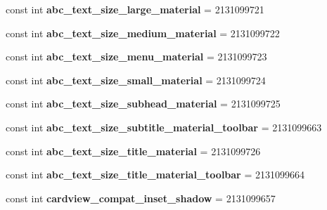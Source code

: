 \begin{DoxyCompactItemize}
const int {\bfseries abc\+\_\+text\+\_\+size\+\_\+large\+\_\+material} = 2131099721
\item 
\mbox{\label{classXaria_1_1Resource_1_1Dimension_a63049d1b1aaddedee1c0da841ba40f75}} 
const int {\bfseries abc\+\_\+text\+\_\+size\+\_\+medium\+\_\+material} = 2131099722
\item 
\mbox{\label{classXaria_1_1Resource_1_1Dimension_aeff3de42f717e6b0f89082926430a041}} 
const int {\bfseries abc\+\_\+text\+\_\+size\+\_\+menu\+\_\+material} = 2131099723
\item 
\mbox{\label{classXaria_1_1Resource_1_1Dimension_ae436e85c64121efc409e4130a584d0ca}} 
const int {\bfseries abc\+\_\+text\+\_\+size\+\_\+small\+\_\+material} = 2131099724
\item 
\mbox{\label{classXaria_1_1Resource_1_1Dimension_a8746c108d9843cbdad05e19d8738c5cf}} 
const int {\bfseries abc\+\_\+text\+\_\+size\+\_\+subhead\+\_\+material} = 2131099725
\item 
\mbox{\label{classXaria_1_1Resource_1_1Dimension_aff1d5013dcbbec71b87a1d5acd63bf78}} 
const int {\bfseries abc\+\_\+text\+\_\+size\+\_\+subtitle\+\_\+material\+\_\+toolbar} = 2131099663
\item 
\mbox{\label{classXaria_1_1Resource_1_1Dimension_aafefaeea1ad40c9f43905544d6b23a03}} 
const int {\bfseries abc\+\_\+text\+\_\+size\+\_\+title\+\_\+material} = 2131099726
\item 
\mbox{\label{classXaria_1_1Resource_1_1Dimension_ab4b1d5906c87209f5f6edec258c8cd34}} 
const int {\bfseries abc\+\_\+text\+\_\+size\+\_\+title\+\_\+material\+\_\+toolbar} = 2131099664
\item 
\mbox{\label{classXaria_1_1Resource_1_1Dimension_a0760a0aea51be8ea983df40b5187155d}} 
const int {\bfseries cardview\+\_\+compat\+\_\+inset\+\_\+shadow} = 2131099657
\item 
\mbox{\label{classXaria_1_1Resource_1_1Dimension_acf8baaaaf20a1636f8d844c64faa099d}} 

\end{DoxyCompactItemize}
